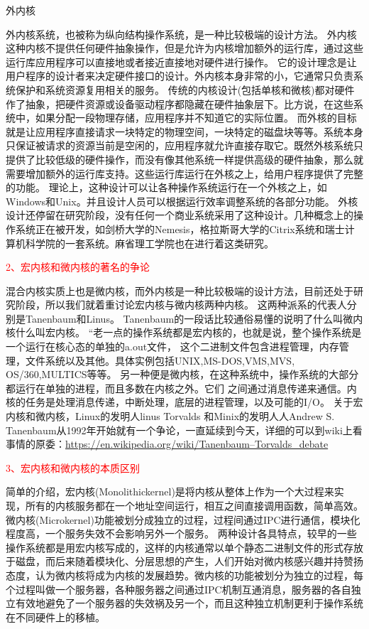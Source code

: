 \documentclass[utf8]{book}
\begin{document}
{\large 外内核}

外内核系统，也被称为纵向结构操作系统，是一种比较极端的设计方法。 
外内核这种内核不提供任何硬件抽象操作，但是允许为内核增加额外的运行库，通过这些运行库应用程序可以直接地或者接近直接地对硬件进行操作。
它的设计理念是让用户程序的设计者来决定硬件接口的设计。外内核本身非常的小，它通常只负责系统保护和系统资源复用相关的服务。
传统的内核设计(包括单核和微核)都对硬件作了抽象，把硬件资源或设备驱动程序都隐藏在硬件抽象层下。比方说，在这些系统中，如果分配一段物理存储，应用程序并不知道它的实际位置。
而外核的目标就是让应用程序直接请求一块特定的物理空间，一块特定的磁盘块等等。系统本身只保证被请求的资源当前是空闲的，应用程序就允许直接存取它。既然外核系统只提供了比较低级的硬件操作，而没有像其他系统一样提供高级的硬件抽象，那么就需要增加额外的运行库支持。这些运行库运行在外核之上，给用户程序提供了完整的功能。
理论上，这种设计可以让各种操作系统运行在一个外核之上，如Windows和Unix。并且设计人员可以根据运行效率调整系统的各部分功能。
外核设计还停留在研究阶段，没有任何一个商业系统采用了这种设计。几种概念上的操作系统正在被开发，如剑桥大学的Nemesis，格拉斯哥大学的Citrix系统和瑞士计算机科学院的一套系统。麻省理工学院也在进行着这类研究。

{\Large \textcolor{red}{2、宏内核和微内核的著名的争论}}

混合内核实质上也是微内核，而外内核是一种比较极端的设计方法，目前还处于研究阶段，所以我们就着重讨论宏内核与微内核两种内核。
这两种派系的代表人分别是Tanenbaum和Linus。 Tanenbaum的一段话比较通俗易懂的说明了什么叫微内核什么叫宏内核。 “老一点的操作系统都是宏内核的，也就是说，整个操作系统是一个运行在核心态的单独的a.out文件， 这个二进制文件包含进程管理，内存管理，文件系统以及其他。具体实例包括UNIX,MS-DOS,VMS,MVS, OS/360,MULTICS等等。 另一种便是微内核，在这种系统中，操作系统的大部分都运行在单独的进程，而且多数在内核之外。它们 之间通过消息传递来通信。内核的任务是处理消息传递，中断处理，底层的进程管理，以及可能的I/O。
关于宏内核和微内核，Linux的发明人linus Torvalds 和Minix的发明人人Andrew S. Tanenbaum从1992年开始就有一个争论，一直延续到今天，详细的可以到wiki上看事情的原委：\href{https://en.wikipedia.org/wiki/Tanenbaum–Torvalds\_debate}{https://en.wikipedia.org/wiki/Tanenbaum–Torvalds\_debate}

{\Large \textcolor{red}{3、宏内核和微内核的本质区别}}

简单的介绍，宏内核(Monolithickernel)是将内核从整体上作为一个大过程来实现，所有的内核服务都在一个地址空间运行，相互之间直接调用函数，简单高效。微内核(Microkernel)功能被划分成独立的过程，过程间通过IPC进行通信，模块化程度高，一个服务失效不会影响另外一个服务。
两种设计各具特点，较早的一些操作系统都是用宏内核写成的，这样的内核通常以单个静态二进制文件的形式存放于磁盘，而后来随着模块化、分层思想的产生，人们开始对微内核感兴趣并持赞扬态度，认为微内核将成为内核的发展趋势。微内核的功能被划分为独立的过程，每个过程叫做一个服务器，各种服务器之间通过IPC机制互通消息，服务器的各自独立有效地避免了一个服务器的失效祸及另一个，而且这种独立机制更利于操作系统在不同硬件上的移植。
\end{document}
